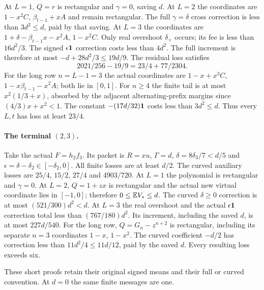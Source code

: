 At $L=1$, $Q=r$ is rectangular and $\gamma=0$, saving $d$.
At $L=2$ the coordinates are
$1-x^2C$, $\beta_{t-1}+xA$ and remain rectangular.
The full $\gamma=\delta$ cross correction is less than
$3d^2\le d$, paid by that saving.
At $L=3$ the coordinates are
$1+\delta-\beta_{t-1}x-x^2A$, $1-x^2C$.
Only real overshoot $\delta_+$ occurs; its fee is less than
$16d^2/3$. The signed $\epsilon\mathbf1$ correction costs less
than $4d^2$. The full increment is therefore at most
$-d+28d^2/3\le19d/9$.
The residual loss satisfies
\[
 2021/256-19/9=23/4+77/2304.
\]
For the long row $n=L-1=3$ the actual coordinates are
$1-x+x^3C$, $1-x\beta_{t-1}-x^2A$; both lie in $[0,1]$.
For $n\ge4$ the finite tail is at most $x^2(1/3+x)$,
absorbed by the adjacent alternating-prefix margins since
$(4/3)x+x^2<1$. The constant $-(17d/32)\mathbf1$ costs less
than $3d^2\le d$. Thus every $L,t$ has loss at least $23/4$.

\paragraph{The terminal $(2,3)$.}
Take the actual $F=h_2f_3$. Its packet is
$R=xu$, $\Gamma=d$,
$\delta=8\delta_3/7<d/5$ and
$\epsilon=\delta-\delta_2\in[-\delta_2,0]$.
All finite losses are at least $d/2$.
The curved auxiliary losses are
$25/4$, $15/2$, $27/4$ and $4903/720$.
At $L=1$ the polynomial is rectangular and $\gamma=0$.
At $L=2$, $Q=1+zx$ is rectangular and the actual new virtual
coordinate lies in $[-1,0]$; therefore
$0\le\mathbb E V_*\le d$.
The curved $\delta\ge0$ correction is at most
$(521/300)d^2<d$.
At $L=3$ the real overshoot and the actual
$\epsilon\mathbf1$ correction total less than $(767/180)d^2$.
Its increment, including the saved $d$, is at most
$227d/540$. For the long row,
$Q=G_n-z^{n+2}$ is rectangular, including its separate
$n=3$ coordinates $1-x$, $1-x^2$.
The curved coefficient $-d/2$ has correction less than
$11d^2/4\le11d/12$, paid by the saved $d$.
Every resulting loss exceeds six.

These short proofs retain their original signed means and their
full or curved convention. At $d=0$ the same finite messages are one.
